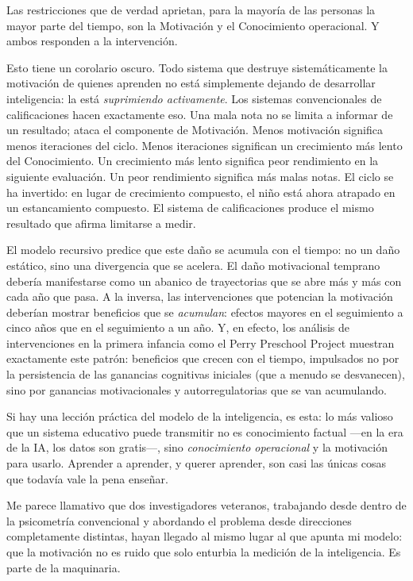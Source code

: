 \documentclass[11pt, twoside, openright]{book}
\begin{document}
Las restricciones que de verdad aprietan, para la mayoría de las personas la mayor parte del tiempo, son la Motivación y el Conocimiento operacional. Y ambos responden a la intervención.

Esto tiene un corolario oscuro. Todo sistema que destruye sistemáticamente la motivación de quienes aprenden no está simplemente dejando de desarrollar inteligencia: la está \textit{suprimiendo activamente}. Los sistemas convencionales de calificaciones hacen exactamente eso. Una mala nota no se limita a informar de un resultado; ataca el componente de Motivación. Menos motivación significa menos iteraciones del ciclo. Menos iteraciones significan un crecimiento más lento del Conocimiento. Un crecimiento más lento significa peor rendimiento en la siguiente evaluación. Un peor rendimiento significa más malas notas. El ciclo se ha invertido: en lugar de crecimiento compuesto, el niño está ahora atrapado en un estancamiento compuesto. El sistema de calificaciones produce el mismo resultado que afirma limitarse a medir.

El modelo recursivo predice que este daño se acumula con el tiempo: no un daño estático, sino una divergencia que se acelera. El daño motivacional temprano debería manifestarse como un abanico de trayectorias que se abre más y más con cada año que pasa. A la inversa, las intervenciones que potencian la motivación deberían mostrar beneficios que se \textit{acumulan}: efectos mayores en el seguimiento a cinco años que en el seguimiento a un año. Y, en efecto, los análisis de intervenciones en la primera infancia como el Perry Preschool Project muestran exactamente este patrón: beneficios que crecen con el tiempo, impulsados no por la persistencia de las ganancias cognitivas iniciales (que a menudo se desvanecen), sino por ganancias motivacionales y autorregulatorias que se van acumulando.

Si hay una lección práctica del modelo de la inteligencia, es esta: lo más valioso que un sistema educativo puede transmitir no es conocimiento factual ---en la era de la IA, los datos son gratis---, sino \textit{conocimiento operacional} y la motivación para usarlo. Aprender a aprender, y querer aprender, son casi las únicas cosas que todavía vale la pena enseñar.

Me parece llamativo que dos investigadores veteranos, trabajando desde dentro de la psicometría convencional y abordando el problema desde direcciones completamente distintas, hayan llegado al mismo lugar al que apunta mi modelo: que la motivación no es ruido que solo enturbia la medición de la inteligencia. Es parte de la maquinaria.
\end{document}
